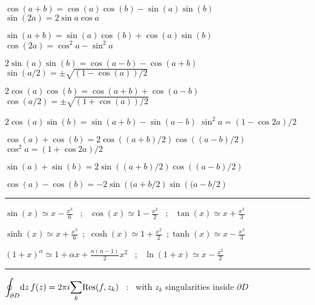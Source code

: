 \begin{squishlist} 
\item $\cos(a+b) = \cos(a)\cos(b)-\sin(a)\sin(b)$ \squishsep $\sin(2a) = 2\sin a \cos a$
\item $\sin(a+b) = \sin(a)\cos(b) + \cos(a)\sin(b)$ \squishsep $\cos(2a) = \cos^2 a - \sin^2 a$
\item $2\sin(a)\sin(b) = \cos(a-b) - \cos(a+b)$ \smallsquishsep $\sin(a/2) = \pm \sqrt{(1-\cos(a))/2}$
\item $2\cos(a)\cos(b) = \cos(a+b) + \cos(a-b)$ \smallsquishsep $\cos(a/2) = \pm \sqrt{(1+\cos(a))/2}$
\item $2\cos(a)\sin(b) = \sin(a+b) - \sin(a-b)$ \smallsquishsep $\sin^2a = (1-\cos 2a)/2$
\item $\cos(a) + \cos(b) = 2\cos\left((a+b)/2\right)\cos\left((a-b)/2\right)$ \;\squishitem \; $\cos^2 a = (1+\cos 2a) / 2$
\item $\sin(a) + \sin(b) = 2\sin\left((a+b)/2\right)\cos\left((a-b)/2\right)$ 
\item $\cos(a) - \cos(b) = -2\sin\left((a+b/2\right)\sin\left((a-b/2\right)$ 

\vspace{-0.1cm}\rule{\columnwidth}{0.5pt}\vspace{-0.1cm}
\item $\sin(x) \simeq x - \frac{x^{3}}{6}$ \, ; \, $\cos(x) \simeq 1 - \frac{x^{2}}{2}$ \, ; \, $\tan(x) \simeq x + \frac{x^{3}}{3}$
\item $\sinh(x) \simeq x + \frac{x^{3}}{6}$  \,;\, $\cosh(x) \simeq 1 + \frac{x^{2}}{2}$   \,;\,$\tanh(x) \simeq x - \frac{x^{3}}{3}$
\item $\left(1+x \right)^{\alpha} \simeq 1 + \alpha x + \frac{\alpha(\alpha -1)}{2}x^2$ \, ; \, $\ln(1+x) \simeq x - \frac{x^2}{2} $ 
\vspace{-0.1cm}\rule{\columnwidth}{0.5pt}\vspace{-0.1cm}
\item $\displaystyle{\oint_{\partial D}} \textrm{d} z \, f(z) = 2\pi i \displaystyle{\sum_{k}} \text{Res}(f,z_k)$ \, : \, with $z_k$ singularities inside $\partial D$  %


\end{squishlist}

